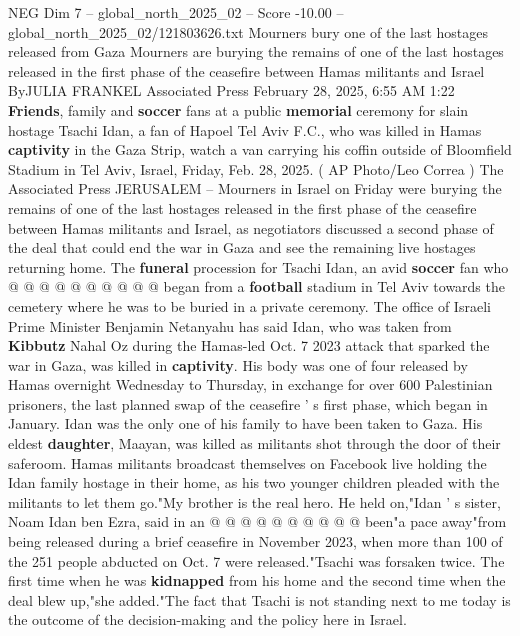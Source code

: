 \begin{textsample}{NEG Dim 7 – global\_north\_2025\_02 – Score -10.00 – global\_north\_2025\_02/121803626.txt}  \label{ex:f7_neg_069}
Mourners bury one of the last hostages released from Gaza Mourners are burying the remains of one of the last hostages released in the first phase of the ceasefire between Hamas militants and Israel ByJULIA FRANKEL Associated Press February 28, 2025, 6:55 AM 1:22 \textbf{Friends}, family and \textbf{soccer} fans at a public \textbf{memorial} ceremony for slain hostage Tsachi Idan, a fan of Hapoel Tel Aviv F.C., who was killed in Hamas \textbf{captivity} in the Gaza Strip, watch a van carrying his coffin outside of Bloomfield Stadium in Tel Aviv, Israel, Friday, Feb. 28, 2025. ( AP Photo/Leo Correa ) The Associated Press JERUSALEM -- Mourners in Israel on Friday were burying the remains of one of the last hostages released in the first phase of the ceasefire between Hamas militants and Israel, as negotiators discussed a second phase of the deal that could end the war in Gaza and see the remaining live hostages returning home.
The \textbf{funeral} procession for Tsachi Idan, an avid \textbf{soccer} fan who @ @ @ @ @ @ @ @ @ @ began from a \textbf{football} stadium in Tel Aviv towards the cemetery where he was to be buried in a private ceremony.
The office of Israeli Prime Minister Benjamin Netanyahu has said Idan, who was taken from \textbf{Kibbutz} Nahal Oz during the Hamas-led Oct. 7 2023 attack that sparked the war in Gaza, was killed in \textbf{captivity}.
His body was one of four released by Hamas overnight Wednesday to Thursday, in exchange for over 600 Palestinian prisoners, the last planned swap of the ceasefire ' s first phase, which began in January.
Idan was the only one of his family to have been taken to Gaza.
His eldest \textbf{daughter}, Maayan, was killed as militants shot through the door of their saferoom.
Hamas militants broadcast themselves on Facebook live holding the Idan family hostage in their home, as his two younger children pleaded with the militants to let them go."My brother is the real hero.
He held on,"Idan ' s sister, Noam Idan ben Ezra, said in an @ @ @ @ @ @ @ @ @ @ been"a pace away"from being released during a brief ceasefire in November 2023, when more than 100 of the 251 people abducted on Oct. 7 were released."Tsachi was forsaken twice.
The first time when he was \textbf{kidnapped} from his home and the second time when the deal blew up,"she added."The fact that Tsachi is not standing next to me today is the outcome of the decision-making and the policy here in Israel.

\end{textsample}
